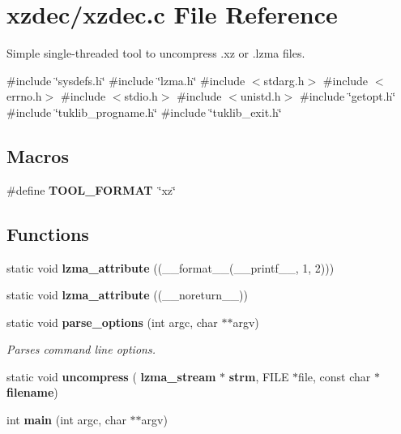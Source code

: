 \section{xzdec/xzdec.c File Reference}
\label{xzdec_8c}


Simple single-\/threaded tool to uncompress .xz or .lzma files.  


{\ttfamily \#include \char`\"{}sysdefs.\+h\char`\"{}}\newline
{\ttfamily \#include \char`\"{}lzma.\+h\char`\"{}}\newline
{\ttfamily \#include $<$stdarg.\+h$>$}\newline
{\ttfamily \#include $<$errno.\+h$>$}\newline
{\ttfamily \#include $<$stdio.\+h$>$}\newline
{\ttfamily \#include $<$unistd.\+h$>$}\newline
{\ttfamily \#include \char`\"{}getopt.\+h\char`\"{}}\newline
{\ttfamily \#include \char`\"{}tuklib\+\_\+progname.\+h\char`\"{}}\newline
{\ttfamily \#include \char`\"{}tuklib\+\_\+exit.\+h\char`\"{}}\newline
\subsection*{Macros}
\begin{DoxyCompactItemize}
\item 
\mbox{\label{xzdec_8c_aeb6169de58908cc8d54b70e9caba325c}} 
\#define {\bfseries T\+O\+O\+L\+\_\+\+F\+O\+R\+M\+AT}~\char`\"{}xz\char`\"{}
\end{DoxyCompactItemize}
\subsection*{Functions}
\begin{DoxyCompactItemize}
\item 
\mbox{\label{xzdec_8c_a7407a84e0f83a82d1e7bdee869504eff}} 
static void {\bfseries lzma\+\_\+attribute} ((\+\_\+\+\_\+format\+\_\+\+\_\+(\+\_\+\+\_\+printf\+\_\+\+\_\+, 1, 2)))
\item 
\mbox{\label{xzdec_8c_a1957d0c8f6ec2eb4950e67226425ee7c}} 
static void {\bfseries lzma\+\_\+attribute} ((\+\_\+\+\_\+noreturn\+\_\+\+\_\+))
\item 
static void \textbf{ parse\+\_\+options} (int argc, char $\ast$$\ast$argv)
\begin{DoxyCompactList}\small\item\em Parses command line options. \end{DoxyCompactList}\item 
\mbox{\label{xzdec_8c_a392ba619796fa4e882d5050ee362e7d4}} 
static void {\bfseries uncompress} (\textbf{ lzma\+\_\+stream} $\ast$\textbf{ strm}, F\+I\+LE $\ast$file, const char $\ast$\textbf{ filename})
\item 
\mbox{\label{xzdec_8c_a3c04138a5bfe5d72780bb7e82a18e627}} 
int {\bfseries main} (int argc, char $\ast$$\ast$argv)
\end{DoxyCompactItemize}
